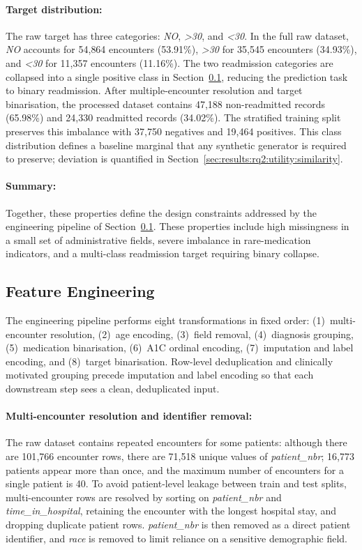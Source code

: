 \paragraph{Target distribution:}
The raw target has three categories: \emph{NO}, \emph{>30}, and
\emph{<30}. In the full raw dataset, \emph{NO} accounts for 54{,}864
encounters (53.91\%), \emph{>30} for 35{,}545 encounters (34.93\%), and
\emph{<30} for 11{,}357 encounters (11.16\%). The two readmission
categories are collapsed into a single positive class in
Section~\ref{sec:data:fe}, reducing the prediction task to binary
readmission. After multiple-encounter resolution and target binarisation,
the processed dataset contains 47{,}188 non-readmitted records (65.98\%)
and 24{,}330 readmitted records (34.02\%). The stratified training split
preserves this imbalance with 37{,}750 negatives and 19{,}464 positives.
This class distribution defines a baseline marginal that any synthetic
generator is required to preserve; deviation is quantified in
Section~\ref{sec:results:rq2:utility:similarity}.

\paragraph{Summary:}
Together, these properties define the design constraints addressed by 
the engineering pipeline of Section~\ref{sec:data:fe}. These properties 
include high missingness in a small set of administrative fields, severe 
imbalance in rare-medication indicators, and a multi-class readmission 
target requiring binary collapse.

\subsection{Feature Engineering}
\label{sec:data:fe}

The engineering pipeline performs eight transformations in fixed order:
(1)~multi-encounter resolution, (2)~age encoding, (3)~field removal,
(4)~diagnosis grouping, (5)~medication binarisation, (6)~A1C ordinal
encoding, (7)~imputation and label encoding, and (8)~target binarisation.
Row-level deduplication and clinically motivated grouping precede
imputation and label encoding so that each downstream step sees a clean,
deduplicated input.

\paragraph{Multi-encounter resolution and identifier removal:}
The raw dataset contains repeated encounters for some patients: although
there are 101{,}766 encounter rows, there are 71{,}518 unique values of
\emph{patient\_nbr}; 16{,}773 patients appear more than once, and the
maximum number of encounters for a single patient is 40. To avoid
patient-level leakage between train and test splits, multi-encounter rows
are resolved by sorting on
\emph{patient\_nbr} and \emph{time\_in\_hospital}, retaining the
encounter with the longest hospital stay, and dropping duplicate patient
rows. \emph{patient\_nbr} is then removed as a direct patient identifier,
and \emph{race} is removed to limit reliance on a sensitive demographic
field.

